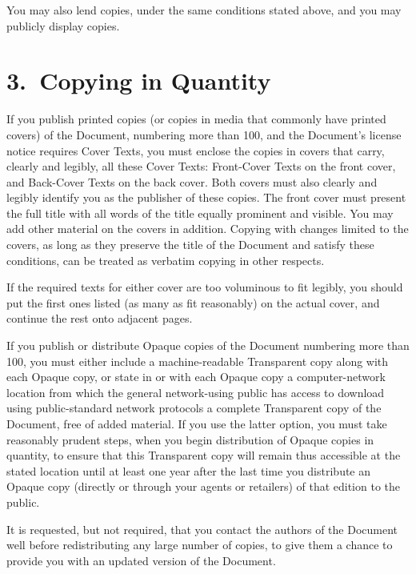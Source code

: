 You may also lend copies, under the same conditions stated above, and
you may publicly display copies.



\section*{3.\ Copying in Quantity}

If you publish printed copies (or copies in media that commonly have
printed covers) of the Document, numbering more than 100, and the
Document's license notice requires Cover Texts, you must enclose the
copies in covers that carry, clearly and legibly, all these Cover
Texts: Front-Cover Texts on the front cover, and Back-Cover Texts on
the back cover. Both covers must also clearly and legibly identify you
as the publisher of these copies. The front cover must present the
full title with all words of the title equally prominent and visible.
You may add other material on the covers in addition. Copying with
changes limited to the covers, as long as they preserve the title of
the Document and satisfy these conditions, can be treated as verbatim
copying in other respects.

If the required texts for either cover are too voluminous to fit
legibly, you should put the first ones listed (as many as fit
reasonably) on the actual cover, and continue the rest onto adjacent
pages.

If you publish or distribute Opaque copies of the Document numbering
more than 100, you must either include a machine-readable Transparent
copy along with each Opaque copy, or state in or with each Opaque copy
a computer-network location from which the general network-using
public has access to download using public-standard network protocols
a complete Transparent copy of the Document, free of added material.
If you use the latter option, you must take reasonably prudent steps,
when you begin distribution of Opaque copies in quantity, to ensure
that this Transparent copy will remain thus accessible at the stated
location until at least one year after the last time you distribute an
Opaque copy (directly or through your agents or retailers) of that
edition to the public.

It is requested, but not required, that you contact the authors of the
Document well before redistributing any large number of copies, to
give them a chance to provide you with an updated version of the
Document.



